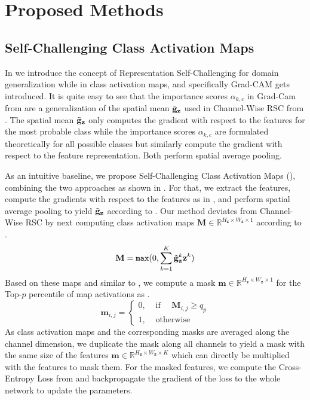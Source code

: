\chapter{Proposed Methods}

\section{Self-Challenging Class Activation Maps}
In  we introduce the concept of Representation Self-Challenging for domain generalization while in  class activation maps, and specifically Grad-CAM gets introduced. It is quite easy to see that the importance scores $\alpha_{k,c}$ in Grad-Cam from  are a generalization of the spatial mean $\Tilde{\mathbf{g}}_\mathbf{z}$ used in Channel-Wise RSC from . The spatial mean $\Tilde{\mathbf{g}}_\mathbf{z}$ only computes the gradient with respect to the features for the most probable class while the importance scores $\alpha_{k,c}$ are formulated theoretically for all possible classes but similarly compute the gradient with respect to the feature representation. Both perform spatial average pooling.  

As an intuitive baseline, we propose Self-Challenging Class Activation Maps (\scam), combining the two approaches as shown in . For that, we extract the features, compute the gradients with respect to the features as in , and perform spatial average pooling to yield $\Tilde{\mathbf{g}}_\mathbf{z}$ according to . Our method deviates from Channel-Wise RSC by next computing class activation maps $\mathbf{M} \in \mathbb{R}^{H_\mathbf{z} \times W_\mathbf{z} \times 1}$ according to .
\begin{equation}
    \mathbf{M} = \mathtt{max}(0,\sum_{k=1}^K\Tilde{\mathbf{g}}_\mathbf{z}^k \mathbf{z}^k)
    \label{eq:Map}
\end{equation}
Based on these maps and similar to , we compute a mask $\mathbf{m} \in \mathbb{R}^{H_\mathbf{z} \times W_\mathbf{z} \times 1}$ for the Top-$p$ percentile of map activations as . 
\begin{equation}
\mathbf{m}_{i,j}=\left\{\begin{array}{ll}
0, & \text { if } \quad \mathbf{M}_{i,j} \geq q_{p} \\
1, & \text { otherwise }
\end{array}\right.
\label{eq:MaskMap}
\end{equation}
As class activation maps and the corresponding masks are averaged along the channel dimension, we duplicate the mask along all channels to yield a mask with the same size of the features $\mathbf{m} \in \mathbb{R}^{H_\mathbf{z} \times W_\mathbf{z} \times K}$ which can directly be multiplied with the features to mask them. For the masked features, we compute the Cross-Entropy Loss from  and backpropagate the gradient of the loss to the whole network to update the parameters.

